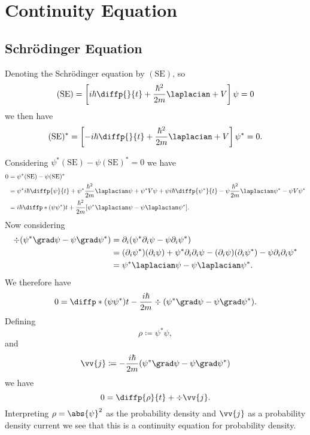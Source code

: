 \documentclass[fleqn]{NotesClass}
\begin{document}
    \section{Continuity Equation}
    \subsection{Schr\"odinger Equation}
    Denoting the Schr\"odinger equation by \((\mathrm{SE})\), so
    \begin{equation}
        (\mathrm{SE}) = \left[ i\hbar\diffp{}{t} + \frac{\hbar^2}{2m}\laplacian + V \right]\psi = 0
    \end{equation}
    we then have
    \begin{equation}
        (\mathrm{SE})^* = \left[ -i\hbar\diffp{}{t} + \frac{\hbar^2}{2m}\laplacian + V \right]\psi^* = 0.
    \end{equation}
    
    Considering \(\psi^*(\mathrm{SE}) - \psi(\mathrm{SE})^* = 0\) we have
    \begin{align}
        0 &= \psi^*(\mathrm{SE}) - \psi(\mathrm{SE})^*\\
        &= \psi^* i\hbar\diffp{\psi}{t} + \psi^*\frac{\hbar^2}{2m} \laplacian \psi + \psi^*V\psi + \psi i\hbar \diffp{\psi^*}{t} - \psi \frac{\hbar^2}{2m} \laplacian \psi^* - \psi V \psi^*\\
        &= i\hbar \diffp*{(\psi\psi^*)}{t} + \frac{\hbar^2}{2m} [\psi^*\laplacian \psi - \psi \laplacian \psi^*].
    \end{align}
    Now considering
    \begin{align}
        \div (\psi^* \grad \psi - \psi \grad \psi^*) &= \partial_i (\psi^*\partial_i\psi - \psi\partial_i\psi^*)\\
        &= (\partial_i\psi^*)(\partial_i\psi) + \psi^*\partial_i\partial_i\psi - (\partial_i\psi)(\partial_i\psi^*) - \psi\partial_i\partial_i\psi^*\\
        &= \psi^* \laplacian \psi - \psi \laplacian \psi^*.
    \end{align}
    We therefore have
    \begin{equation}
        0 = \diffp*{(\psi\psi^*)}{t} - \frac{i\hbar}{2m}\div(\psi^*\grad \psi - \psi \grad \psi^*).
    \end{equation}
    Defining
    \begin{equation}
        \rho \coloneqq \psi^* \psi,
    \end{equation}
    and
    \begin{equation}
        \vv{j} \coloneqq -\frac{i\hbar}{2m}(\psi^* \grad \psi - \psi \grad \psi^*)
    \end{equation}
    we have
    \begin{equation}
        0 = \diffp{\rho}{t} + \div \vv{j}.
    \end{equation}
    Interpreting \(\rho = \abs{\psi}^2\) as the probability density and \(\vv{j}\) as a probability density current we see that this is a continuity equation for probability density.
    
\end{document}
